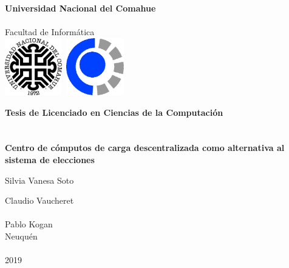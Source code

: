 
\titlepage

\begin{center}
\ \\
\ \\
\vspace{-1cm}
 

\ \\

\vspace{0.5cm}
{\Large{\bf \sc Universidad Nacional del Comahue}}\\

\ \\
{\Large { \sc Facultad de Informática}}\\

\vspace{-2.5cm}
\mbox{\hspace{-1cm}\includegraphics[width=2.5cm,height=2.5cm]{img/unc.png}\hspace{13cm} \includegraphics[width=2.5cm,height=2.5cm]{img/fai.png}}


\vspace{6cm}

{\Large {\bf\sc Tesis de Licenciado en Ciencias de la Computaci\'on}}\\
\ \\
\ \\
{\LARGE {\bf Centro de cómputos de carga descentralizada como alternativa al sistema de elecciones}}\\
\vspace{3cm}


{\Large Silvia Vanesa Soto}\\
\vspace{2cm}

{\Large Claudio Vaucheret}\\
\ \\
{\Large Pablo Kogan}\\

\vfill
{\Large {\sc Neuqu\'en}\hspace{6cm}{\sc Argentina}}\\
\ \\

{\Large 2019}\\

\end{center}

\pagebreak

